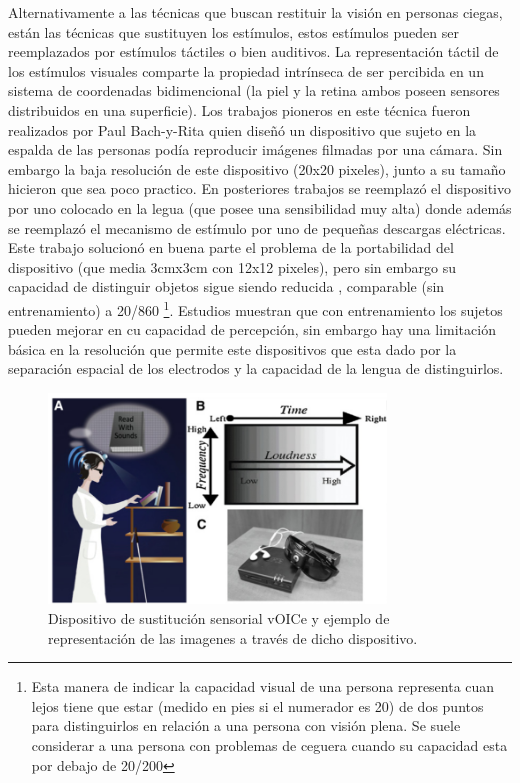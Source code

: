 \documentclass{article}
\begin{document}
    Alternativamente a las técnicas que buscan restituir la visión en personas ciegas, están las técnicas que sustituyen los estímulos, estos estímulos pueden ser reemplazados por estímulos táctiles o bien auditivos. La representación táctil de los estímulos visuales comparte la propiedad intrínseca de ser percibida en un sistema de coordenadas bidimencional (la piel y la retina ambos poseen sensores distribuidos en una superficie). Los trabajos pioneros en este técnica fueron realizados por Paul Bach-y-Rita \cite{Tactil1} quien diseñó un dispositivo que sujeto en la espalda de las personas podía reproducir imágenes filmadas por una cámara. Sin embargo la baja resolución de este dispositivo (20x20 pixeles), junto a su tamaño hicieron que sea poco practico. En posteriores trabajos \cite{Tactil2} se reemplazó el dispositivo por uno colocado en la legua (que posee una sensibilidad muy alta) donde además se reemplazó el mecanismo de estímulo por uno de pequeñas descargas eléctricas. Este trabajo solucionó en buena parte el problema de la portabilidad del dispositivo (que media 3cmx3cm con 12x12 pixeles), pero sin embargo su capacidad de distinguir objetos sigue siendo reducida \cite{Tactil3}, comparable (sin entrenamiento) a 20/860 \footnote{Esta manera de indicar la capacidad visual de una persona representa cuan lejos tiene que estar (medido en pies si el numerador es 20) de dos puntos para distinguirlos en relación a una persona con visión plena. Se suele considerar a una persona con problemas de ceguera cuando su capacidad esta por debajo de 20/200}. Estudios \cite{Tactil4} muestran que con entrenamiento los sujetos pueden mejorar en cu capacidad de percepción, sin embargo hay una limitación básica en la resolución que permite este dispositivos que esta dado por la separación espacial de los electrodos y la capacidad de la lengua de distinguirlos. 
    
    \begin{figure}
        \center
        \includegraphics[width=0.8\textwidth]{Imagenes/Voice2.png}
        \caption{Dispositivo de sustitución sensorial vOICe y ejemplo de representación de las imagenes a través de dicho dispositivo.}
        \label{fig:Voice2}
    \end{figure}
    
\end{document}
